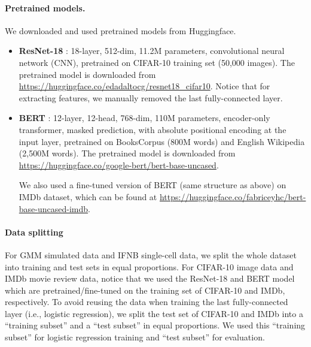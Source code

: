 \paragraph{Pretrained models.} We downloaded and used pretrained models from Huggingface.
\begin{itemize}
    \item \textbf{ResNet-18} \cite{resnet}: 18-layer, 512-dim, 11.2M parameters, convolutional neural network (CNN), pretrained on CIFAR-10 training set (50,000 images). The pretrained model is downloaded from \url{https://huggingface.co/edadaltocg/resnet18_cifar10}. Notice that for extracting features, we manually removed the last fully-connected layer.
    \item \textbf{BERT} \cite{BERT}: 12-layer, 12-head, 768-dim, 110M parameters, encoder-only transformer, masked prediction, with absolute positional encoding at the input layer, pretrained on BooksCorpus (800M words) and English Wikipedia (2,500M words). The pretrained model is downloaded from \url{https://huggingface.co/google-bert/bert-base-uncased}.

    We also used a fine-tuned version of BERT (same structure as above) on IMDb dataset, which can be found at \url{https://huggingface.co/fabriceyhc/bert-base-uncased-imdb}.
\end{itemize}


\paragraph{Data splitting} For GMM simulated data and IFNB single-cell data, we split the whole dataset into training and test sets in equal proportions. For CIFAR-10 image data and IMDb movie review data, notice that we used the ResNet-18 and BERT model which are pretrained/fine-tuned on the training set of CIFAR-10 and IMDb, respectively. To avoid reusing the data when training the last fully-connected layer (i.e., logistic regression), we split the test set of CIFAR-10 and IMDb into a ``training subset'' and a ``test subset'' in equal proportions. We used this ``training subset'' for logistic regression training and ``test subset'' for evaluation.



